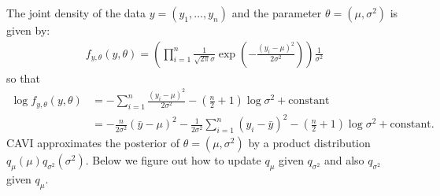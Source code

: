 \documentclass{scrartcl}
\begin{document}
The joint density of the data $y = (y_1, \dots, y_n)$ and the parameter
$\theta = (\mu, \sigma^2)$ is given by:
\begin{align*}
  f_{y, \theta}(y, \theta) = \left(\prod_{i=1}^n \frac{1}{\sqrt{2 \pi}
  \sigma} \exp \left(-\frac{(y_i - \mu)^2}{2 \sigma^2} \right) \right)
  \frac{1}{\sigma^2} 
\end{align*}
so that
\begin{align*}
  \log f_{y, \theta}(y, \theta) &= -\sum_{i=1}^n \frac{(y_i - \mu)^2}{2
  \sigma^2} - \left(\frac{n}{2} + 1 \right) \log \sigma^2 +
                                  \text{constant} \\
  &= -\frac{n}{2 \sigma^2} (\bar{y} - \mu)^2 - \frac{1}{2 \sigma^2}
    \sum_{i=1}^n (y_i - \bar{y})^2 - \left(\frac{n}{2} + 1 \right)
    \log \sigma^2 +  \text{constant}. 
\end{align*}
CAVI approximates the posterior of $\theta = (\mu, \sigma^2)$ by a
product distribution $q_{\mu}(\mu) q_{\sigma^2}(\sigma^2)$. Below we
figure out how to update $q_{\mu}$ given $q_{\sigma^2}$ and also
$q_{\sigma^2}$ given $q_{\mu}$.
\end{document}
